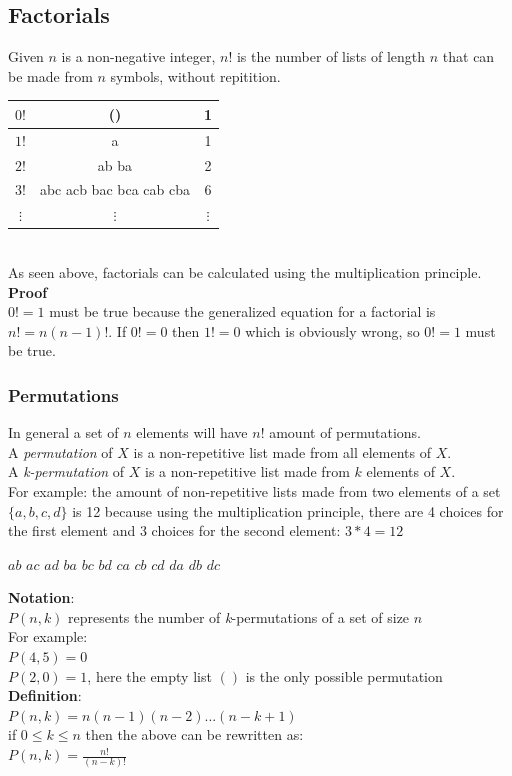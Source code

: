 \documentclass[a4paper,11pt]{article}
\begin{document}
\subsection{Factorials}
Given $n$ is a non-negative integer, $n!$ is the number of lists of length $n$ that can be made from $n$ symbols, without repitition.\vspace{5pt}\\
\begin{tabular}{|c|c|c|}
 \hline
 $0!$ & () & 1\\
 \hline
 $1!$ & a & 1\\
 \hline
 $2!$ & ab ba & 2\\
 \hline
 $3!$ & abc acb bac bca cab cba & 6\\
 \hline
 $\vdots$ & $\vdots$ & $\vdots$\\
 \hline
\end{tabular}\vspace{5pt}\\
As seen above, factorials can be calculated using the multiplication principle.\vspace{5pt}\\
\textbf{Proof}\\
$0!=1$ must be true because the generalized equation for a factorial is $n!=n(n-1)!$. If $0!=0$ then $1!=0$ which is obviously wrong, so $0!=1$ must be true.
\subsubsection{Permutations}
In general a set of $n$ elements will have $n!$ amount of permutations.\\
A \textit{permutation} of $X$ is a non-repetitive list made from all elements of $X$.\\
A \textit{k-permutation} of $X$ is a non-repetitive list made from $k$ elements of $X$.\vspace{5pt}\\
For example: the amount of non-repetitive lists made from two elements of a set $\{a, b, c, d\}$ is 12 because using the multiplication principle, there are 4 choices for the first element and 3 choices for the second element: $3*4=12$
\begin{center}
  $ab$ $ac$ $ad$ $ba$ $bc$ $bd$ $ca$ $cb$ $cd$ $da$ $db$ $dc$
\end{center}
\textbf{Notation}:\\
$P(n,k)$ represents the number of \textit{k}-permutations of a set of size $n$\\
For example:\\
$P(4,5)=0$\\
$P(2,0)=1$, here the empty list $()$ is the only possible permutation\vspace{5pt}\\
\textbf{Definition}:\\
$P(n,k)=n(n-1)(n-2)...(n-k+1)$\\
if $0 \leq k \leq n$ then the above can be rewritten as:\\$P(n,k)=\frac{n!}{(n-k)!}$
\end{document}
